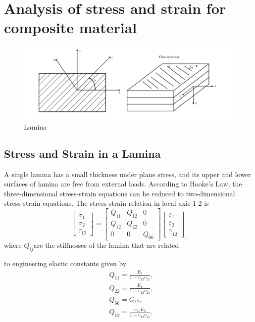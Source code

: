 \section{Analysis of stress and strain for composite material}

\begin{figure}[!htb]
	\centering
	\includegraphics[width=\linewidth]{image/lamina_local_global_axes.png}
\caption{Lamina}
  	\label{fig:lamina}
\end{figure}

\subsection{Stress and Strain in a Lamina}
A single lamina has a small thickness under plane stress, and its upper and lower surfaces of lamina are
free from external loads. According to Hooke's Law, the three-dimensional stress-strain equations can be reduced to
two-dimensional stress-strain equations. The stress-strain relation in local axis 1-2 is
\begin{equation}
    \begin{bmatrix}
        \sigma _1\\
        \sigma _2\\
        \tau_{12}
    \end{bmatrix}
    =
    \begin{bmatrix}
        Q_{11} & Q_{12} & 0\\
        Q_{12} & Q_{22} & 0\\
        0      &  0     & Q_{66}
    \end{bmatrix}
    \begin{bmatrix}
        \varepsilon_1\\
        \varepsilon_2\\\gamma_{12}
	\end{bmatrix}_{\textstyle ,} 
\end{equation}
where $Q_{ij} $are the stiffnesses of the lamina that are related

to engineering elastic constants given by
\begin{equation}
    \begin{split}
	&Q_{11}=\frac{E_1}{1-v_{12}v_{21}},\\
	&Q_{22}=\frac{E_2}{1-v_{12}v_{21}},\\
	&Q_{66}=G_{12},\\
	&Q_{12}=\frac{v_{21}E_2}{1-v_{12}v_{21}},\\
    \end{split}
\end{equation}

